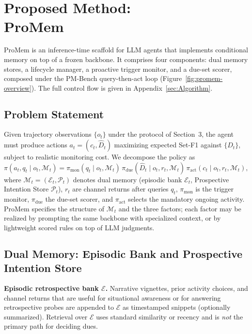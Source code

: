 \section{Proposed Method:\\ ProMem}
\label{sec:methods}

ProMem is an inference-time scaffold for LLM agents that implements conditional memory on top of a frozen backbone. It comprises four components: dual memory stores, a lifecycle manager, a proactive trigger monitor, and a due-set scorer, composed under the PM-Bench query-then-act loop (Figure~\ref{fig:promem-overview}). The full control flow is given in Appendix~\ref{sec:Algorithm}.

\subsection{Problem Statement}
\label{sec:problem}

Given trajectory observations $\{o_t\}$ under the protocol of Section~3, the agent must produce actions $a_t=(c_t,\hat{D}_t)$ maximizing expected Set-F1 against $\{D_t\}$, subject to realistic monitoring cost. We decompose the policy as
\begin{equation}
\label{eq:policy-factor}
\pi(a_t,q_t\mid o_t,\mathcal{M}_t)
=
\pi_{\mathrm{mon}}(q_t\mid o_t,\mathcal{M}_t)\,
\pi_{\mathrm{due}}(\hat{D}_t\mid o_t,r_t,\mathcal{M}_t)\,
\pi_{\mathrm{act}}(c_t\mid o_t,r_t,\mathcal{M}_t),
\end{equation}
where $\mathcal{M}_t=(\mathcal{E}_t,\mathcal{P}_t)$ denotes dual memory (episodic bank $\mathcal{E}_t$, Prospective Intention Store $\mathcal{P}_t$), $r_t$ are channel returns after queries $q_t$, $\pi_{\mathrm{mon}}$ is the trigger monitor, $\pi_{\mathrm{due}}$ the due-set scorer, and $\pi_{\mathrm{act}}$ selects the mandatory ongoing activity. ProMem specifies the structure of $\mathcal{M}_t$ and the three factors; each factor may be realized by prompting the same backbone with specialized context, or by lightweight scored rules on top of LLM judgments.

\subsection{Dual Memory: Episodic Bank and Prospective Intention Store}
\label{sec:dual}

\noindent\textbf{Episodic retrospective bank $\mathcal{E}$.}
Narrative vignettes, prior activity choices, and channel returns that are useful for situational awareness or for answering retrospective probes are appended to $\mathcal{E}$ as timestamped snippets (optionally summarized). Retrieval over $\mathcal{E}$ uses standard similarity or recency and is \emph{not} the primary path for deciding dues.

